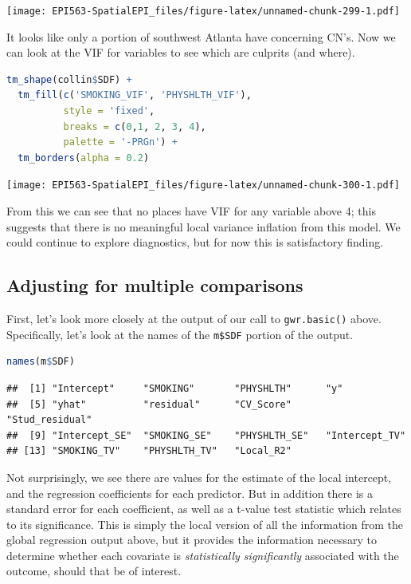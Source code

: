 \documentclass[
]{book}
\newcommand{\passthrough}[1]{#1}
\begin{document}
\texttt{[image: EPI563-SpatialEPI\_files/figure-latex/unnamed-chunk-299-1.pdf]}

It looks like only a portion of southwest Atlanta have concerning CN's. Now we can look at the VIF for variables to see which are culprits (and where).

\begin{lstlisting}[language=R]
tm_shape(collin$SDF) +
  tm_fill(c('SMOKING_VIF', 'PHYSHLTH_VIF'),
          style = 'fixed',
          breaks = c(0,1, 2, 3, 4),
          palette = '-PRGn') +
  tm_borders(alpha = 0.2) 
\end{lstlisting}

\texttt{[image: EPI563-SpatialEPI\_files/figure-latex/unnamed-chunk-300-1.pdf]}

From this we can see that no places have VIF for any variable above 4; this suggests that there is no meaningful local variance inflation from this model. We could continue to explore diagnostics, but for now this is satisfactory finding.

\hypertarget{adjusting-for-multiple-comparisons}{%
\subsection{Adjusting for multiple comparisons}\label{adjusting-for-multiple-comparisons}}

First, let's look more closely at the output of our call to \passthrough{\lstinline!gwr.basic()!} above. Specifically, let's look at the names of the \passthrough{\lstinline!m$SDF!} portion of the output.

\begin{lstlisting}[language=R]
names(m$SDF)
\end{lstlisting}

\begin{lstlisting}
##  [1] "Intercept"     "SMOKING"       "PHYSHLTH"      "y"            
##  [5] "yhat"          "residual"      "CV_Score"      "Stud_residual"
##  [9] "Intercept_SE"  "SMOKING_SE"    "PHYSHLTH_SE"   "Intercept_TV" 
## [13] "SMOKING_TV"    "PHYSHLTH_TV"   "Local_R2"
\end{lstlisting}

Not surprisingly, we see there are values for the estimate of the local intercept, and the regression coefficients for each predictor. But in addition there is a standard error for each coefficient, as well as a t-value test statistic which relates to its significance. This is simply the local version of all the information from the global regression output above, but it provides the information necessary to determine whether each covariate is \emph{statistically significantly} associated with the outcome, should that be of interest.
\end{document}
